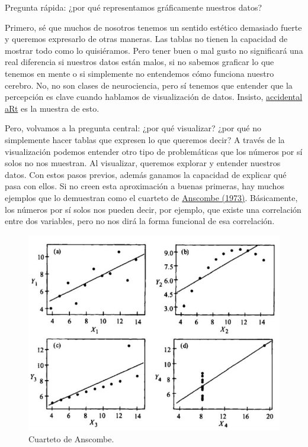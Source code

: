 \documentclass[]{book}
\begin{document}
Pregunta rápida: ¿por qué representamos gráficamente nuestros datos?

Primero, sé que muchos de nosotros tenemos un sentido estético demasiado
fuerte y queremos expresarlo de otras maneras. Las tablas no tienen la
capacidad de mostrar todo como lo quisiéramos. Pero tener buen o mal
gusto no significará una real diferencia si nuestros datos están malos,
si no sabemos graficar lo que tenemos en mente o si simplemente no
entendemos cómo funciona nuestro cerebro. No, no son clases de
neurociencia, pero sí tenemos que entender que la percepción es clave
cuando hablamos de visualización de datos. Insisto,
\href{https://twitter.com/accidental__aRt}{accidental aRt} es la muestra
de esto.

Pero, volvamos a la pregunta central: ¿por qué visualizar? ¿por qué no
simplemente hacer tablas que expresen lo que queremos decir? A través de
la visualización podemos entender otro tipo de problemáticas que los
números por sí solos no nos muestran. Al visualizar, queremos explorar y
entender nuestros datos. Con estos pasos previos, además ganamos la
capacidad de explicar qué pasa con ellos. Si no creen esta aproximación
a buenas primeras, hay muchos ejemplos que lo demuestran como el
cuarteto de
\href{http://www.sjsu.edu/faculty/gerstman/StatPrimer/anscombe1973.pdf}{Anscombe
(1973)}. Básicamente, los números por sí solos nos pueden decir, por
ejemplo, que existe una correlación entre dos variables, pero no nos
dirá la forma funcional de esa correlación.

\begin{figure}

{\centering \includegraphics[width=1\linewidth]{00-images/dataviz_anscombe} 

}

\caption{Cuarteto de Anscombe.}\label{fig:anscombe}
\end{figure}
\end{document}
